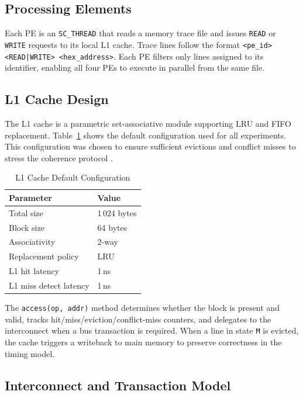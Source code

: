 \documentclass[journal,trans]{IEEEtran}
\begin{document}
\subsection{Processing Elements}
 
Each PE is an \texttt{SC\_THREAD} that reads a memory trace file and issues
\texttt{READ} or \texttt{WRITE} requests to its local L1 cache. Trace lines
follow the format \texttt{<pe\_id> <READ|WRITE> <hex\_address>}. Each PE
filters only lines assigned to its identifier, enabling all four PEs to execute
in parallel from the same file.
 
\subsection{L1 Cache Design}
 
The L1 cache is a parametric set-associative module supporting LRU and FIFO
replacement. Table~\ref{tab:l1config} shows the default configuration used
for all experiments. This configuration was chosen to ensure sufficient
evictions and conflict misses to stress the coherence protocol
\cite{hennessy2017computer, patterson2013computer}.
 \begin{table}[htbp]
 \centering 
\caption{L1 Cache Default Configuration}
\label{tab:l1config}
\renewcommand{\arraystretch}{1.2}
\begin{tabular}{ll}
\toprule
\textbf{Parameter}          & \textbf{Value} \\
\midrule
Total size                  & 1\,024 bytes   \\
Block size                  & 64 bytes       \\
Associativity               & 2-way          \\
Replacement policy          & LRU            \\
L1 hit latency              & 1\,ns          \\
L1 miss detect latency      & 1\,ns          \\
\bottomrule
\end{tabular}
\end{table}
 
The \texttt{access(op, addr)} method determines whether the block is present
and valid, tracks hit/miss/eviction/conflict-miss counters, and delegates to
the interconnect when a bus transaction is required.
When a line in state \texttt{M} is evicted, the cache triggers a writeback to
main memory to preserve correctness in the timing model.
 
\subsection{Interconnect and Transaction Model}
 
\end{document}
